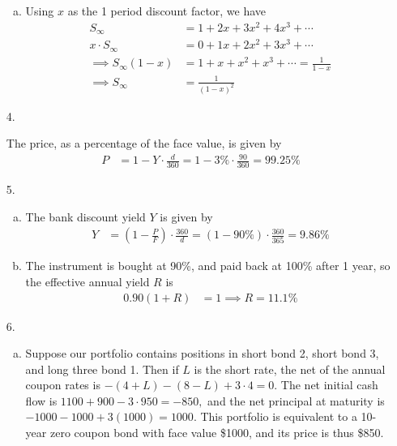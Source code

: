 \documentclass{article}
\begin{document}
\begin{enumerate}
\begin{enumerate}[(a)]
			\item
				\begin{soln}
					Using $x$ as the 1 period discount factor, we have
					\begin{align*}
						S_{\infty} &= 1+2x+3x^2+4x^3+\cdots \\
						x\cdot S_{\infty} &= 0 + 1x + 2x^2 + 3x^3 + \cdots \\
						\implies S_{\infty} (1-x) &= 1 + x + x^2 + x^3 + \cdots = \frac{1}{1-x} \\
						\implies S_{\infty} &= \frac{1}{(1-x)^2}
					\end{align*}
				\end{soln}

		\end{enumerate}

	\item[4.]
		\begin{soln}
			The price, as a percentage of the face value, is given by
			\begin{align*}
				P &= 1-Y\cdot \frac{d}{360} = 1-3\%\cdot \frac{90}{360} = 99.25\%
			\end{align*}
		\end{soln}

	\item[5.]
		\begin{enumerate}[(a)]
			\item 
				\begin{soln}
					The bank discount yield $Y$ is given by
					\begin{align*}
						Y &= \left( 1-\frac{P}{F} \right)\cdot \frac{360}{d} = (1-90\%)\cdot \frac{360}{365} = 9.86\%
					\end{align*}
				\end{soln}

			\item 
				\begin{soln}
					The instrument is bought at 90\%, and paid back at 100\% after 1 year, so the effective annual yield $R$ is
					\begin{align*}
						0.90(1+R) &= 1 \implies R = 11.1\%
					\end{align*}
					
				\end{soln}
		\end{enumerate}

	\item[6.]
		\begin{enumerate}[(a)]
			\item 
				\begin{soln}
					Suppose our portfolio contains positions in short bond 2, short bond 3, and long three bond 1. Then if $L$ is the short rate, the net of the annual coupon rates is $-(4+L)-(8-L)+3\cdot 4 = 0.$ The net initial cash flow is $1100+900-3\cdot 950 = -850,$ and the net principal at maturity is $-1000-1000+3(1000) = 1000.$ This portfolio is equivalent to a 10-year zero coupon bond with face value \$1000, and its price is thus \$850.
				\end{soln}


\end{enumerate}
\end{enumerate}
\end{document}

